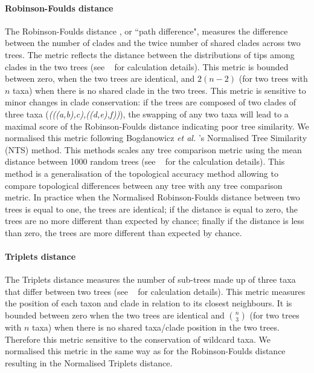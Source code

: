 \documentclass[10pt,letterpaper]{article}
\begin{document}
\paragraph*{Robinson-Foulds distance}
The Robinson-Foulds distance \cite{RF1981}, or ``path difference", measures the difference between the number of clades and the twice number of shared clades across two trees. The metric reflects the distance between the distributions of tips among clades in the two trees \cite{RF1981} (see ~ for calculation details). This metric is bounded between zero, when the two trees are identical, and $2(n-2)$ (for two trees with $n$ taxa) when there is no shared clade in the two trees. This metric is sensitive to minor changes in clade conservation: if the trees are composed of two clades of three taxa (\textit{(((a,b),c),((d,e),f))}), the swapping of any two taxa will lead to a maximal score of the Robinson-Foulds distance indicating poor tree similarity. We normalised this metric following Bogdanowicz \textit{et al.} \cite{Bogdanowicz2012}'s Normalised Tree Similarity (NTS) method. This methods scales %
any tree comparison metric using the mean distance between 1000 random trees (see ~ for the calculation details). This method is a generalisation of the topological accuracy method \cite{Price2010} allowing to compare topological differences between any tree with any tree comparison metric. In practice when the Normalised Robinson-Foulds distance between two trees is equal to one, the trees are identical; if the distance is equal to zero, the trees are no more different than expected by chance; finally if the distance is less than zero, the trees are more different than expected by chance.

\paragraph*{Triplets distance}
The Triplets distance \cite{dobson1975triplets} measures the number of sub-trees made up of three taxa that differ between two trees \cite{critchlowthe1996} (see ~ for calculation details). This metric measures the position of each taxon and clade in relation to its closest neighbours. It is bounded between zero when the two trees are identical and $\binom{n}{3}$ (for two trees with $n$ taxa) when there is no shared taxa/clade position in the two trees. Therefore this metric sensitive to the conservation of wildcard taxa. We normalised this metric in the same way as for the Robinson-Foulds distance resulting in the Normalised Triplets distance.
\end{document}
